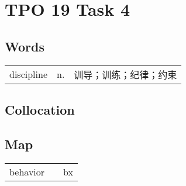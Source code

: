 \section{TPO 19 Task 4}

\subsection{Words}

\begin{tabular}{lll}
    discipline & n. & 训导；训练；纪律；约束 \\
\end{tabular}

\subsection{Collocation}

\subsection{Map}

\begin{tabular}{rc@{\quad$\to$\quad}l}
    behavior &  & bx \\
\end{tabular}
